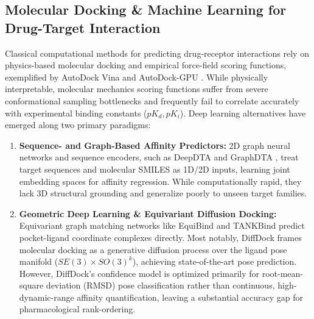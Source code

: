 \documentclass{article}
\theoremstyle{definition}
\begin{document}
\subsection{Molecular Docking \& Machine Learning for Drug-Target Interaction}
Classical computational methods for predicting drug-receptor interactions rely on physics-based molecular docking and empirical force-field scoring functions, exemplified by AutoDock Vina \citep{trott2010autodock} and AutoDock-GPU \citep{santos2021autodock}. While physically interpretable, molecular mechanics scoring functions suffer from severe conformational sampling bottlenecks and frequently fail to correlate accurately with experimental binding constants ($pK_d, pK_i$). Deep learning alternatives have emerged along two primary paradigms:
\begin{enumerate}[leftmargin=1.5em,noitemsep]
    \item \textbf{Sequence- and Graph-Based Affinity Predictors:} 2D graph neural networks and sequence encoders, such as DeepDTA \citep{ozturk2018deepdta} and GraphDTA \citep{nguyen2021graphdta}, treat target sequences and molecular SMILES as 1D/2D inputs, learning joint embedding spaces for affinity regression. While computationally rapid, they lack 3D structural grounding and generalize poorly to unseen target families.
    \item \textbf{Geometric Deep Learning \& Equivariant Diffusion Docking:} Equivariant graph matching networks like EquiBind \citep{stark2022equibind} and TANKBind \citep{lu2022tankbind} predict pocket-ligand coordinate complexes directly. Most notably, DiffDock \citep{corso2023diffdock} frames molecular docking as a generative diffusion process over the ligand pose manifold ($SE(3) \times SO(3)^k$), achieving state-of-the-art pose prediction. However, DiffDock's confidence model is optimized primarily for root-mean-square deviation (RMSD) pose classification rather than continuous, high-dynamic-range affinity quantification, leaving a substantial accuracy gap for pharmacological rank-ordering.
\end{enumerate}
\end{document}

